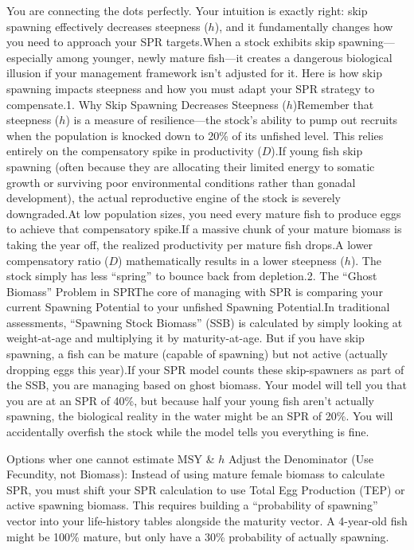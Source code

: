 \documentclass[
  authoryear,
  preprint,
  3p]{elsarticle}
\begin{document}
You are connecting the dots perfectly. Your intuition is exactly right:
skip spawning effectively decreases steepness (\(h\)), and it
fundamentally changes how you need to approach your SPR targets.When a
stock exhibits skip spawning---especially among younger, newly mature
fish---it creates a dangerous biological illusion if your management
framework isn't adjusted for it. Here is how skip spawning impacts
steepness and how you must adapt your SPR strategy to compensate.1. Why
Skip Spawning Decreases Steepness (\(h\))Remember that steepness (\(h\))
is a measure of resilience---the stock's ability to pump out recruits
when the population is knocked down to 20\% of its unfished level. This
relies entirely on the compensatory spike in productivity (\(D\)).If
young fish skip spawning (often because they are allocating their
limited energy to somatic growth or surviving poor environmental
conditions rather than gonadal development), the actual reproductive
engine of the stock is severely downgraded.At low population sizes, you
need every mature fish to produce eggs to achieve that compensatory
spike.If a massive chunk of your mature biomass is taking the year off,
the realized productivity per mature fish drops.A lower compensatory
ratio (\(D\)) mathematically results in a lower steepness (\(h\)). The
stock simply has less ``spring'' to bounce back from depletion.2. The
``Ghost Biomass'' Problem in SPRThe core of managing with SPR is
comparing your current Spawning Potential to your unfished Spawning
Potential.In traditional assessments, ``Spawning Stock Biomass'' (SSB)
is calculated by simply looking at weight-at-age and multiplying it by
maturity-at-age. But if you have skip spawning, a fish can be mature
(capable of spawning) but not active (actually dropping eggs this
year).If your SPR model counts these skip-spawners as part of the SSB,
you are managing based on ghost biomass. Your model will tell you that
you are at an SPR of 40\%, but because half your young fish aren't
actually spawning, the biological reality in the water might be an SPR
of 20\%. You will accidentally overfish the stock while the model tells
you everything is fine.

Options wher one cannot estimate MSY \& \(h\) Adjust the Denominator
(Use Fecundity, not Biomass): Instead of using mature female biomass to
calculate SPR, you must shift your SPR calculation to use Total Egg
Production (TEP) or active spawning biomass. This requires building a
``probability of spawning'' vector into your life-history tables
alongside the maturity vector. A 4-year-old fish might be 100\% mature,
but only have a 30\% probability of actually spawning.
\end{document}
